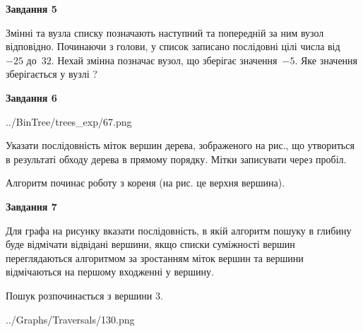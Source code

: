 \documentclass[12pt, ukrainian]{article}
\begin{document}
{\begin {large}
{\begin {center}\textbf{Завдання 5}\end {center}}\par
Змінні  та  вузла списку позначають наступний та попередній за ним вузол відповідно. Починаючи з голови, у список записано послідовні цілі числа від~$-25$ до~$32$. Нехай змінна  позначає вузол, що зберігає значення~$-5$.
Яке значення зберігається у вузлі  ?\par
\newpage

{\begin {center}\textbf{Завдання 6}\end {center}}\par

\begin{center}
	{../BinTree/trees_exp/67.png}
\end{center}
Указати послідовність міток вершин дерева, зображеного на рис., що утвориться в результаті обходу дерева в прямому порядку. Мітки записувати через пробіл.\par Алгоритм починає роботу з кореня (на рис. це верхня вершина).\par
\newpage

{\begin {center}\textbf{Завдання 7}\end {center}}\par
Для графа на рисунку вказати послідовність, в якій алгоритм пошуку в глибину буде відмічати відвідані вершини, якщо списки суміжності вершин переглядаються алгоритмом за зростанням міток вершин та вершини відмічаються на першому вход\-женні у вершину.\par
Пошук розпочинається з вершини 3.\par

\begin{center}
	{../Graphs/Traversals/130.png}
\end{center}\par
\newpage


\end{large}}
\end{document}
